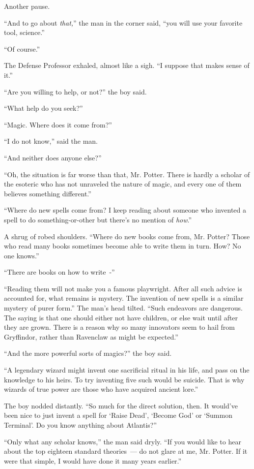Another pause.

``And to go about \emph{that,}'' the man in the corner said, ``you will use your favorite tool, science.''

``Of course.''

The Defense Professor exhaled, almost like a sigh. ``I suppose that makes sense of it.''

``Are you willing to help, or not?'' the boy said.

``What help do you seek?''

``Magic. Where does it come from?''

``I do not know,'' said the man.

``And neither does anyone else?''

``Oh, the situation is far worse than that, Mr. Potter. There is hardly a scholar of the esoteric who has not unraveled the nature of magic, and every one of them believes something different.''

``Where do new spells come from? I keep reading about someone who invented a spell to do something-or-other but there's no mention of \emph{how}.''

A shrug of robed shoulders. ``Where do new books come from, Mr. Potter? Those who read many books sometimes become able to write them in turn. How? No one knows.''

``There are books on how to write~-''

``Reading them will not make you a famous playwright. After all such advice is accounted for, what remains is mystery. The invention of new spells is a similar mystery of purer form.'' The man's head tilted. ``Such endeavors are dangerous. The saying is that one should either not have children, or else wait until after they are grown. There is a reason why so many innovators seem to hail from Gryffindor, rather than Ravenclaw as might be expected.''

``And the more powerful sorts of magics?'' the boy said.

``A legendary wizard might invent one sacrificial ritual in his life, and pass on the knowledge to his heirs. To try inventing five such would be suicide. That is why wizards of true power are those who have acquired ancient lore.''

The boy nodded distantly. ``So much for the direct solution, then. It would've been nice to just invent a spell for `Raise Dead', `Become God' or `Summon Terminal'. Do you know anything about Atlantis?''

``Only what any scholar knows,'' the man said dryly. ``If you would like to hear about the top eighteen standard theories~--- do not glare at me, Mr. Potter. If it were that simple, I would have done it many years earlier.''

